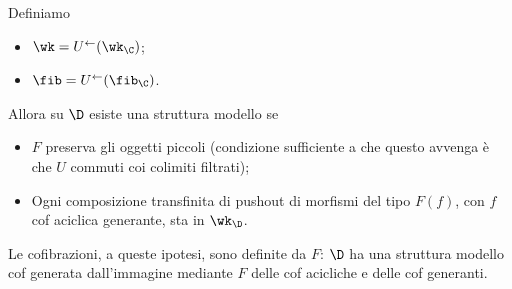 \documentclass[12pt]{amsart}
\begin{document}
Definiamo
\begin{itemize}
	\item $\wk = U^\leftarrow(\wk_\C)$;
	\item $\fib = U^\leftarrow(\fib_\C)$.
\end{itemize}
Allora su $\D$ esiste una struttura modello se
\begin{itemize}
	\item $F$ preserva gli oggetti piccoli (condizione sufficiente a che questo avvenga è che $U$ commuti coi colimiti filtrati);
	\item Ogni composizione transfinita di pushout di morfismi del tipo $F(f)$, con $f$ cof aciclica generante, sta in $\wk_\D$.
\end{itemize}
Le cofibrazioni, a queste ipotesi, sono definite da $F$: $\D$ ha una struttura modello cof generata dall'immagine mediante $F$ delle cof acicliche e delle cof generanti.
\end{document}
